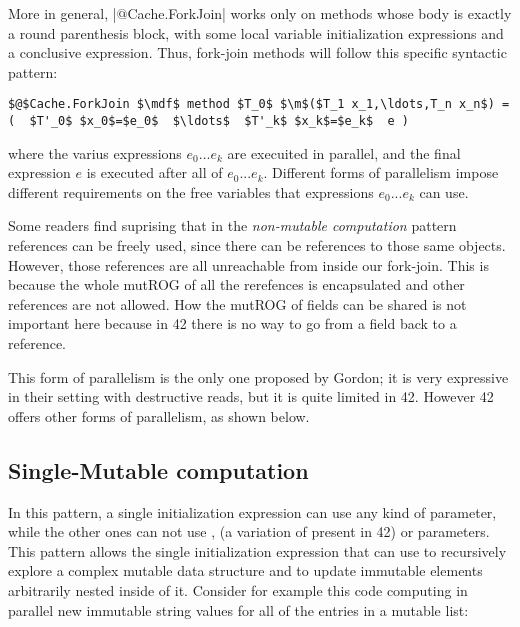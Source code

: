 More in general, \Q|$@$Cache.ForkJoin| works only on methods whose body is exactly a round parenthesis block, with some local variable initialization expressions and a conclusive expression.
Thus, fork-join methods will follow this specific syntactic pattern:
\begin{lstlisting}
$@$Cache.ForkJoin $\mdf$ method $T_0$ $\m$($T_1 x_1,\ldots,T_n x_n$) = (  $T'_0$ $x_0$=$e_0$  $\ldots$  $T'_k$ $x_k$=$e_k$  e )
\end{lstlisting}
where the varius expressions $e_0...e_k$ are execuited in parallel, and the final expression $e$ is executed after all of $e_0...e_k$.
Different forms of parallelism impose different requirements on the free variables that expressions $e_0...e_k$ can use.

Some readers find suprising that in the \emph{non-mutable computation} pattern \Q@read@ references can be freely used, since there can be \Q@mut@ references to those same objects.
However, those \Q@mut@ references are all unreachable from inside our fork-join. This is because the whole
mutROG of all the \Q@capsule@ rerefences is encapsulated and other \Q@mut@ references are not allowed.
How the mutROG of \Q@capsule@ fields can be shared is not important here because in 42 there is no way to go from a \Q@capsule@ field back to a \Q@capsule@ reference.

This form of parallelism is the only one proposed by Gordon; it is very expressive in their setting with destructive reads, but it is quite limited in 42. However 42 offers other forms of parallelism, as shown below.



\subsection*{Single-Mutable computation}
In this pattern, a single initialization expression can use any kind of parameter, while the other ones can not 
use \Q@mut@, \Q@lent@ (a variation of \Q@mut@ present in 42) or \Q@read@ parameters.
This pattern allows the single initialization expression that can use \Q@mut@ to recursively explore a complex mutable data structure and to update immutable elements arbitrarily nested inside of it.
Consider for example this code computing in parallel 
new immutable string values for all of
the entries in a mutable list:


